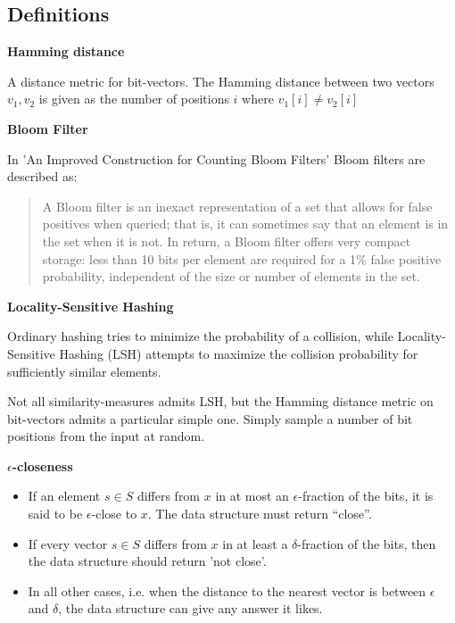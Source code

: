 \documentclass[a4paper,11pt]{article}
\begin{document}
\subsection{Definitions}
\begin{description}
\item \textbf{Hamming distance}

A distance metric for bit-vectors. The Hamming distance between two vectors $v_1, v_2$ is given as the number of positions $i$ where $v_1[i] \neq v_2[i]$

\item \textbf{Bloom Filter}

In 'An Improved Construction for Counting Bloom Filters' \cite{paper:bloom} Bloom filters are described as:
\begin{quotation}
A Bloom filter is an inexact representation of a set that allows for false positives when queried; that is, it can sometimes say that an element is in the set when it is not. In return, a Bloom filter offers very compact storage: less than 10 bits per element are required for a 1\% false positive probability, independent of the size or number of elements in the set.
\end{quotation}


\item \textbf{Locality-Sensitive Hashing}

Ordinary hashing tries to minimize the probability of a collision, while Locality-Sensitive Hashing (LSH) attempts to maximize the collision probability for sufficiently similar elements.

Not all similarity-measures admits LSH, but the Hamming distance metric on bit-vectors admits a particular simple one.
Simply sample a number of bit positions from the input at random.

\item \textbf{$\epsilon$-closeness}
  \begin{itemize}
    \item If an element $s \in S$ differs from $x$ in at most an $\epsilon$-fraction of the bits, it is said to be $\epsilon$-close to $x$. The data structure must return “close”.
    \item If every vector $s \in S$ differs from $x$ in at least a $\delta$-fraction of the bits, then the data structure should return 'not close'.
    \item In all other cases, i.e. when the distance to the nearest vector is between $\epsilon$ and $\delta$, the data structure can give any answer it likes.
  \end{itemize}

\end{description}
\end{document}
